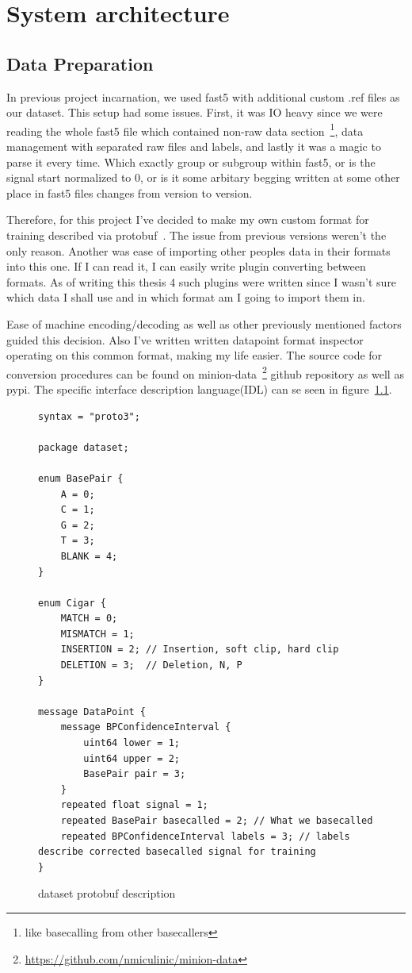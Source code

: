 \documentclass[times, utf8, diplomski, english]{fer}
\begin{document}
\chapter{System architecture}
\section{Data Preparation}

In previous project incarnation, we used fast5 with additional custom .ref files as our dataset. This setup had some issues. First, it was IO heavy since we were reading the whole fast5 file which contained non-raw data section~\footnote{like basecalling from other basecallers}, data management with separated raw files and labels, and lastly it was a magic to parse it every time. Which exactly group or subgroup within fast5, or is the signal start normalized to 0, or is it some arbitary begging written at some other place in fast5 files changes from version to version. 

Therefore, for this project I've decided to make my own custom format for training described via protobuf~\citep{protobuf}. The issue from previous versions weren't the only reason. Another was ease of importing other peoples data in their formats into this one. If I can read it, I can easily write plugin converting between formats. As of writing this thesis 4 such plugins were written since I wasn't sure which data I shall use and in which format am I going to import them in. 

Ease of machine encoding/decoding as well as other previously mentioned factors guided this decision. Also I've written written datapoint format inspector operating on this common format, making my life easier. The source code for conversion procedures can be found on minion-data~\footnote{\url{https://github.com/nmiculinic/minion-data}} github repository as well as pypi. The specific interface description language(IDL) can se seen in figure~\ref{fg:dataset_proto}.


\begin{figure}
    \begin{center}
    \begin{lstlisting}[language=protobuf3,style=protobuf]
syntax = "proto3";

package dataset;

enum BasePair {
    A = 0;
    C = 1;
    G = 2;
    T = 3;
    BLANK = 4;
}

enum Cigar {
    MATCH = 0;
    MISMATCH = 1;
    INSERTION = 2; // Insertion, soft clip, hard clip
    DELETION = 3;  // Deletion, N, P
}

message DataPoint {
    message BPConfidenceInterval {
        uint64 lower = 1;
        uint64 upper = 2;
        BasePair pair = 3;
    }
    repeated float signal = 1;
    repeated BasePair basecalled = 2; // What we basecalled
    repeated BPConfidenceInterval labels = 3; // labels describe corrected basecalled signal for training
}
    \end{lstlisting}
    \caption{dataset protobuf description}
    \label{fg:dataset_proto}
    \end{center}
\end{figure}
\end{document}
